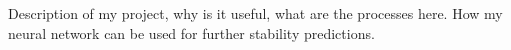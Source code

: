 Description of my project, why is it useful, what are the processes here. How my neural network can be used for further stability predictions.